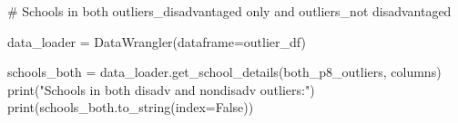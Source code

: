 \documentclass[
  letterpaper,
  DIV=11,
  numbers=noendperiod]{scrartcl}
\newenvironment{Shaded}{\begin{snugshade}}{\end{snugshade}}
\newcommand{\BuiltInTok}[1]{\textcolor[rgb]{0.00,0.23,0.31}{#1}}
\newcommand{\CommentTok}[1]{\textcolor[rgb]{0.37,0.37,0.37}{#1}}
\newcommand{\NormalTok}[1]{\textcolor[rgb]{0.00,0.23,0.31}{#1}}
\newcommand{\OperatorTok}[1]{\textcolor[rgb]{0.37,0.37,0.37}{#1}}
\newcommand{\StringTok}[1]{\textcolor[rgb]{0.13,0.47,0.30}{#1}}
\newcommand{\VariableTok}[1]{\textcolor[rgb]{0.07,0.07,0.07}{#1}}
\begin{document}
\begin{Shaded}
\begin{Highlighting}[]

\CommentTok{\# Schools in both outliers\_disadvantaged only and outliers\_not disadvantaged}

\NormalTok{data\_loader }\OperatorTok{=}\NormalTok{ DataWrangler(dataframe}\OperatorTok{=}\NormalTok{outlier\_df)}

\NormalTok{schools\_both }\OperatorTok{=}\NormalTok{ data\_loader.get\_school\_details(both\_p8\_outliers, columns)}
\BuiltInTok{print}\NormalTok{(}\StringTok{"Schools in both disadv and nondisadv outliers:"}\NormalTok{)}
\BuiltInTok{print}\NormalTok{(schools\_both.to\_string(index}\OperatorTok{=}\VariableTok{False}\NormalTok{))}
\end{Highlighting}
\end{Shaded}
\end{document}
